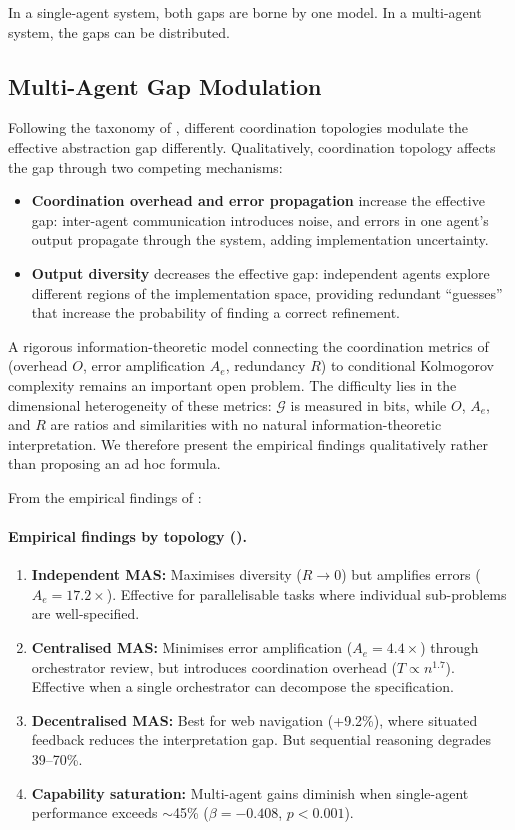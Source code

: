 \documentclass[11pt, a4paper, copyright]{googledeepmind}
\begin{document}
In a single-agent system, both gaps are borne by one model. In a multi-agent system, the gaps can be distributed.

\subsection{Multi-Agent Gap Modulation}

Following the taxonomy of \citet{kim2025scaling}, different coordination topologies modulate the effective abstraction gap differently. Qualitatively, coordination topology affects the gap through two competing mechanisms:

\begin{itemize}
    \item \textbf{Coordination overhead and error propagation} increase the effective gap: inter-agent communication introduces noise, and errors in one agent's output propagate through the system, adding implementation uncertainty.
    \item \textbf{Output diversity} decreases the effective gap: independent agents explore different regions of the implementation space, providing redundant ``guesses'' that increase the probability of finding a correct refinement.
\end{itemize}

A rigorous information-theoretic model connecting the coordination metrics of \citet{kim2025scaling} (overhead $O$, error amplification $A_e$, redundancy $R$) to conditional Kolmogorov complexity remains an important open problem. The difficulty lies in the dimensional heterogeneity of these metrics: $\mathcal{G}$ is measured in bits, while $O$, $A_e$, and $R$ are ratios and similarities with no natural information-theoretic interpretation. We therefore present the empirical findings qualitatively rather than proposing an ad hoc formula.

From the empirical findings of \citet{kim2025scaling}:

\paragraph{Empirical findings by topology (\citealp{kim2025scaling}).}
\label{prop:topology}
\begin{enumerate}
    \item \textbf{Independent MAS:} Maximises diversity ($R \to 0$) but amplifies errors ($A_e = 17.2\times$). Effective for parallelisable tasks where individual sub-problems are well-specified.
    \item \textbf{Centralised MAS:} Minimises error amplification ($A_e = 4.4\times$) through orchestrator review, but introduces coordination overhead ($T \propto n^{1.7}$). Effective when a single orchestrator can decompose the specification.
    \item \textbf{Decentralised MAS:} Best for web navigation (+9.2\%), where situated feedback reduces the interpretation gap. But sequential reasoning degrades 39--70\%.
    \item \textbf{Capability saturation:} Multi-agent gains diminish when single-agent performance exceeds $\sim$45\% ($\beta = -0.408$, $p < 0.001$).
\end{enumerate}
\end{document}
